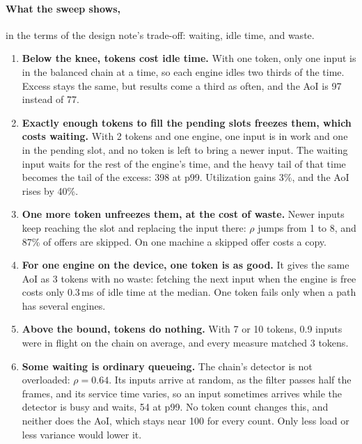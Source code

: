 \documentclass[11pt]{article}
\begin{document}
\paragraph{What the sweep shows,} in the terms of the design note's
trade-off: waiting, idle time, and waste.
\begin{enumerate}[nosep]
  \item \textbf{Below the knee, tokens cost idle time.} With one token, only
        one input is in the balanced chain at a time, so each engine idles
        two thirds of the time. Excess stays the same, but results come a
        third as often, and the AoI is 97 instead of 77.
  \item \textbf{Exactly enough tokens to fill the pending slots freezes
        them, which costs waiting.} With 2 tokens and one engine, one input
        is in work and one in the pending slot, and no token is left to bring
        a newer input. The waiting input waits for the rest of the engine's
        time, and the heavy tail of that time becomes the tail of the excess:
        398 at p99. Utilization gains 3\%, and the AoI rises by 40\%.
  \item \textbf{One more token unfreezes them, at the cost of waste.} Newer
        inputs keep reaching the slot and replacing the input there:
        $\rho$ jumps from 1 to 8, and 87\% of offers are skipped. On one
        machine a skipped offer costs a copy.
  \item \textbf{For one engine on the device, one token is as good.} It
        gives the same AoI as 3 tokens with no waste: fetching the next input
        when the engine is free costs only 0.3\,ms of idle time at the
        median. One token fails only when a path has several engines.
  \item \textbf{Above the bound, tokens do nothing.} With 7 or 10 tokens,
        0.9 inputs were in flight on the chain on average, and every measure
        matched 3 tokens.
  \item \textbf{Some waiting is ordinary queueing.} The chain's detector is
        not overloaded: $\rho = 0.64$. Its inputs arrive at random, as the
        filter passes half the frames, and its service time varies, so an
        input sometimes arrives while the detector is busy and waits, 54 at
        p99. No token count changes this, and neither does the AoI, which
        stays near 100 for every count. Only less load or less variance would
        lower it.
\end{enumerate}
\end{document}
